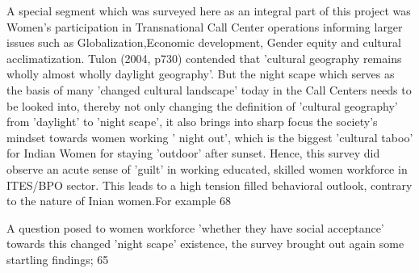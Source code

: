 A special segment which was surveyed here as an integral part of this project was Women's participation in Transnational Call Center operations informing larger issues such as Globalization,Economic development, Gender equity and cultural acclimatization. Tulon (2004, p730) contended that 'cultural geography remains wholly almost wholly daylight geography'. But the night scape which serves as the basis of many 'changed cultural landscape' today in the Call Centers needs to be looked into, thereby not only changing the definition of 'cultural geography' from 'daylight' to 'night scape', it also brings into sharp focus the society's mindset towards women working ' night out', which is the biggest 'cultural taboo' for Indian Women for staying 'outdoor' after sunset. Hence, this survey did observe an  acute sense of 'guilt' in working educated, skilled women workforce in ITES/BPO sector. This leads to a high tension filled behavioral outlook, contrary to the nature of Inian women.For example 68%

A question posed to women workforce 'whether they have social acceptance' towards this changed 'night scape' existence, the survey brought out again some startling findings; 65%

